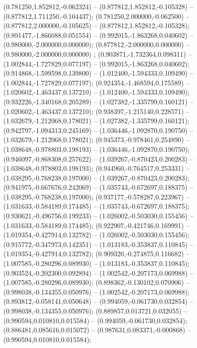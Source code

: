  (0.781250,1.852812,-0.062324) -- (0.877812,1.852812,-0.105328) -- (0.877812,1.711250,-0.104437);
 (0.781250,2.000000,-0.062500) -- (0.877812,2.000000,-0.105625) -- (0.877812,1.852812,-0.105328);
 (0.891477,-1.866088,0.051554) -- (0.992015,-1.863268,0.040602) -- (0.980000,-2.000000,0.000000);
 (0.877812,-2.000000,0.000000) -- (0.980000,-2.000000,0.000000) ;
 (0.903871,-1.732364,0.098311) -- (1.002844,-1.727829,0.077197) -- (0.992015,-1.863268,0.040602);
 (0.914868,-1.599598,0.139800) -- (1.012400,-1.594333,0.109490) -- (1.002844,-1.727829,0.077197);
 (0.924354,-1.468594,0.175589) -- (1.020602,-1.463437,0.137210) -- (1.012400,-1.594333,0.109490);
 (0.932226,-1.340168,0.205289) -- (1.027382,-1.335799,0.160121) -- (1.020602,-1.463437,0.137210);
 (0.938397,-1.215140,0.228571) -- (1.032679,-1.212068,0.178021) -- (1.027382,-1.335799,0.160121);
 (0.942797,-1.094313,0.245169) -- (1.036446,-1.092870,0.190750) -- (1.032679,-1.212068,0.178021);
 (0.945373,-0.978461,0.254890) -- (1.038648,-0.978803,0.198193) -- (1.036446,-1.092870,0.190750);
 (0.946097,-0.868308,0.257622) -- (1.039267,-0.870423,0.200283) -- (1.038648,-0.978803,0.198193);
 (0.944960,-0.764517,0.253331) -- (1.038295,-0.768238,0.197000) -- (1.039267,-0.870423,0.200283);
 (0.941975,-0.667676,0.242069) -- (1.035743,-0.672697,0.188375) -- (1.038295,-0.768238,0.197000);
 (0.937177,-0.578287,0.223967) -- (1.031633,-0.584189,0.174485) -- (1.035743,-0.672697,0.188375);
 (0.930621,-0.496756,0.199233) -- (1.026002,-0.503030,0.155456) -- (1.031633,-0.584189,0.174485);
 (0.922907,-0.421746,0.169991) -- (1.019354,-0.427914,0.132782) -- (1.026002,-0.503030,0.155456);
 (0.915772,-0.347973,0.142351) -- (1.013183,-0.353837,0.110845) -- (1.019354,-0.427914,0.132782);
 (0.909320,-0.274875,0.116682) -- (1.007585,-0.280296,0.089930) -- (1.013183,-0.353837,0.110845);
 (0.903524,-0.202300,0.092894) -- (1.002542,-0.207173,0.069988) -- (1.007585,-0.280296,0.089930);
 (0.898362,-0.130102,0.070906) -- (0.998038,-0.134355,0.050976) -- (1.002542,-0.207173,0.069988);
 (0.893812,-0.058141,0.050648) -- (0.994059,-0.061730,0.032854) -- (0.998038,-0.134355,0.050976);
 (0.889857,0.013721,0.032055) -- (0.990594,0.010810,0.015584) -- (0.994059,-0.061730,0.032854);
 (0.886481,0.085616,0.015072) -- (0.987631,0.083371,-0.000868) -- (0.990594,0.010810,0.015584);
